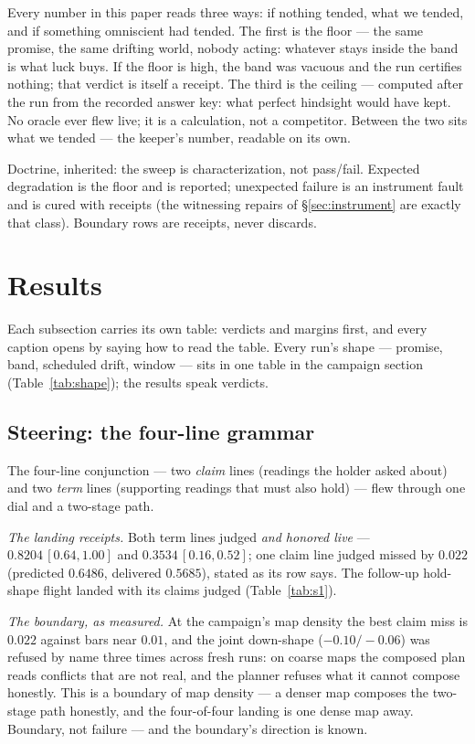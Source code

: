 \documentclass[11pt,a4paper]{article}
\begin{document}
Every number in this paper reads three ways: if nothing tended,
what we tended, and if something omniscient had tended. The first
is the floor --- the same promise, the same drifting world, nobody
acting: whatever stays inside the band is what luck buys. If the
floor is high, the band was vacuous and the run certifies nothing;
that verdict is itself a receipt. The third is the ceiling ---
computed after the run from the recorded answer key: what perfect
hindsight would have kept. No oracle ever flew live; it is a
calculation, not a competitor. Between the two sits what we tended
--- the keeper's number, readable on its own.

Doctrine, inherited: the sweep is characterization, not pass/fail.
Expected degradation is the floor and is reported; unexpected failure
is an instrument fault and is cured with receipts (the witnessing
repairs of \S\ref{sec:instrument} are exactly that class). Boundary
rows are receipts, never discards.

\section{Results}
\label{sec:results}

Each subsection carries its own table: verdicts and margins first,
and every caption opens by saying how to read the table.
Every run's shape --- promise, band, scheduled drift, window ---
sits in one table in the campaign section
(Table~\ref{tab:shape}); the results speak verdicts.

\subsection{Steering: the four-line grammar}
\label{sec:steering}

The four-line conjunction --- two \emph{claim} lines (readings the
holder asked about) and two \emph{term} lines (supporting readings
that must also hold) --- flew through
one dial and a two-stage path.

\emph{The landing receipts.} Both term lines judged \emph{and
honored live} --- $0.8204\,[0.64,1.00]$ and $0.3534\,[0.16,0.52]$;
one claim line judged missed by $0.022$ (predicted $0.6486$,
delivered $0.5685$), stated as its row says. The follow-up
hold-shape flight landed with its claims judged
(Table~\ref{tab:s1}).

\emph{The boundary, as measured.} At the campaign's map density the
best claim miss is $0.022$ against bars near $0.01$, and the joint
down-shape ($-0.10/-0.06$) was refused by name three times across
fresh runs: on coarse maps the composed plan
reads conflicts that are not real, and the planner refuses what it
cannot compose honestly. This is a boundary of map density --- a
denser map composes the two-stage path honestly, and the four-of-four
landing is one dense map away. Boundary, not failure
--- and the boundary's direction is known.
\end{document}

